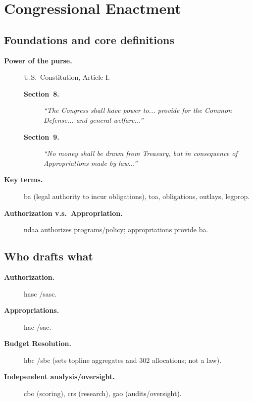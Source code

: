 \documentclass[../main.tex]{subfiles}
\begin{document}
\section{Congressional Enactment}
\subsection{Foundations and core definitions}
\begin{description}
  \item[\textbf{Power of the purse.}] U.S.\ Constitution, Article I.
        \begin{description}
          \item[\textbf{Section~8.}] \textit{\quote ``The Congress shall have power to... provide for the Common Defense... and general welfare...''}
          \item[\textbf{Section~9.}] \textit{\quote ``No money shall be drawn from Treasury, but in consequence of Appropriations made by law...''}
        \end{description}
  \item[\textbf{Key terms.}] \ac{ba} (legal authority to incur obligations), \ac{toa}, obligations, outlays, \ac{legprop}.
  \item[\textbf{Authorization v.s.\ Appropriation.}] \ac{ndaa} authorizes programs/policy; appropriations provide \ac{ba}.
\end{description}

\subsection{Who drafts what}
\begin{description}
  \item[\textbf{Authorization.}] \ac{hasc} /\ac{sasc}.
  \item[\textbf{Appropriations.}] \ac{hac} /\ac{sac}.
  \item[\textbf{Budget Resolution.}] \ac{hbc} /\ac{sbc} (sets topline aggregates and 302 allocations; not a law).
  \item[\textbf{Independent analysis/oversight.}] \ac{cbo} (scoring), \ac{crs} (research), \ac{gao} (audits/oversight).
\end{description}
\end{document}
